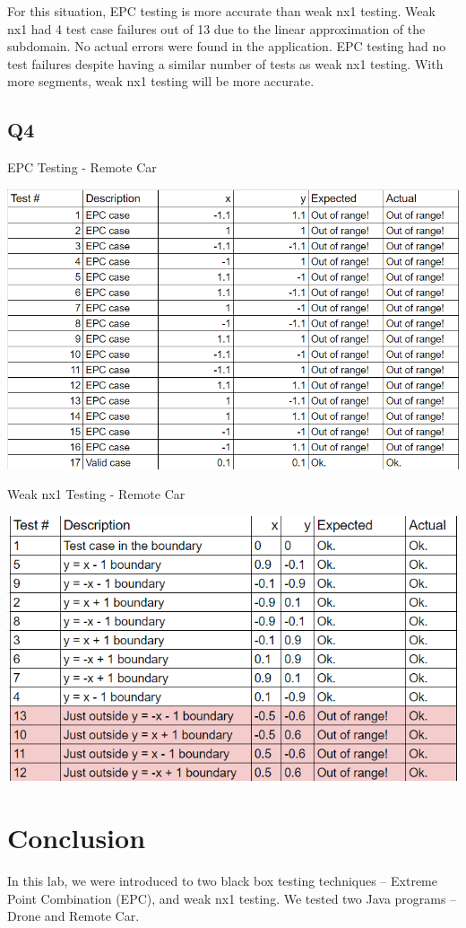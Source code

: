 \documentclass[12pt, letterpaper, titlepage]{article}
\begin{document}
For this situation, EPC testing is more accurate than weak nx1 testing. Weak nx1 had 4 test case failures out of 13 due to the linear approximation of the subdomain. No actual errors were found in the application. EPC testing had no test failures despite having a similar number of tests as weak nx1 testing. With more segments, weak nx1 testing will be more accurate.

\subsection{Q4}
EPC Testing - Remote Car

\includegraphics[scale=1]{image3.png}

\newpage
Weak nx1 Testing - Remote Car

\includegraphics[scale=1]{image4.png}

\section{Conclusion}
In this lab, we were introduced to two black box testing techniques -- Extreme Point Combination (EPC), and weak nx1 testing. We tested two Java programs -- Drone and Remote Car.
\end{document}
